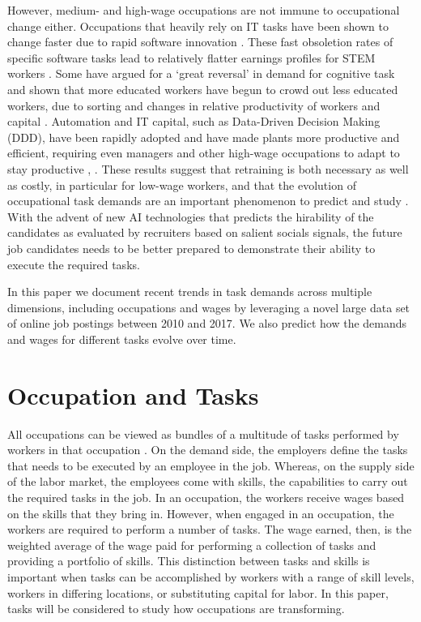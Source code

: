 \documentclass[letterpaper]{article} %
\begin{document}
However, medium- and high-wage occupations are not immune to occupational change either. Occupations that heavily rely on IT tasks have been shown to change faster due to rapid software innovation \cite{Hershbein2018}. These fast obsoletion rates of specific software tasks lead to relatively flatter earnings profiles for STEM workers \cite{Deming2018a}. Some have argued for a `great reversal' in demand for cognitive task and shown that more educated workers have begun to crowd out less educated workers, due to sorting and changes in relative productivity of workers and capital \cite{BeaudryGreenSand2015}. Automation and IT capital, such as Data-Driven Decision Making (DDD), have been rapidly adopted and have made plants more productive and efficient, requiring even managers and other high-wage occupations to adapt to stay productive \cite{Brynjolfsson2016}, \cite{Bartel2007}. These results suggest that retraining is both necessary as well as costly, in particular for low-wage workers, and that the evolution of occupational task demands are an important phenomenon to predict and study \cite{atalay2019evolution}. With the advent of new AI technologies \cite{hemamou2019hirenet} that predicts the hirability of the candidates as evaluated by recruiters based on salient socials signals, the future job candidates needs to be better prepared to demonstrate their ability to execute the required tasks.
\par
In this paper we document recent trends in task demands across multiple dimensions, including occupations and wages by leveraging a novel large data set of online job postings between 2010 and 2017. We also predict how the demands and wages for different tasks evolve over time.


\section{Occupation and Tasks}
\label{sec:data}
%
All occupations can be viewed as bundles of a multitude of tasks performed by workers in that occupation \cite{Acemoglu2018c}. On the demand side, the employers define the tasks that needs to be executed by an employee in the job. Whereas, on the supply side of the labor market, the employees come with skills, the capabilities to carry out the required tasks in the job. In an occupation, the workers receive wages based on the skills that they bring in. However, when engaged in an occupation, the workers are required to perform a number of tasks. The wage earned, then, is the weighted average of the wage paid for performing a collection of tasks and providing a portfolio of skills. This distinction between tasks and skills is important when tasks can be accomplished by workers with a range of skill levels, workers in differing locations, or substituting capital for labor. In this paper, tasks will be considered to study how occupations are transforming. 
\end{document}
